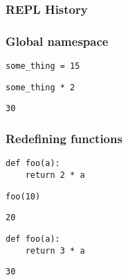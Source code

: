 \begin{frame}
\frametitle{REPL History}
\end{frame}

\begin{frame}[fragile]
\frametitle{Global namespace}

\begin{lstlisting}[frame=single]
some_thing = 15
\end{lstlisting}

\begin{lstlisting}[frame=single]
some_thing * 2
\end{lstlisting}

\begin{lstlisting}[frame=single]
30
\end{lstlisting}

\end{frame}

\begin{frame}[fragile]
\frametitle{Redefining functions}

\begin{lstlisting}[frame=single]
def foo(a):
    return 2 * a
\end{lstlisting}

\begin{lstlisting}[frame=single]
foo(10)
\end{lstlisting}

\begin{lstlisting}[frame=single]
20
\end{lstlisting}

\begin{lstlisting}[frame=single]
def foo(a):
    return 3 * a
\end{lstlisting}

\begin{lstlisting}[frame=single]
30
\end{lstlisting}

\end{frame}

